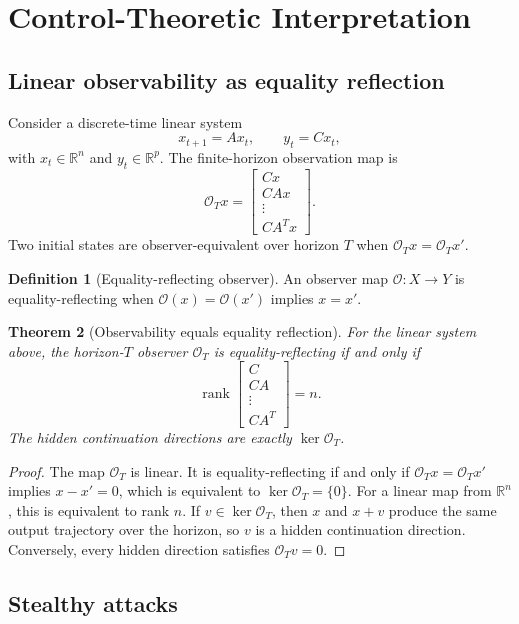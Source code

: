 \documentclass[11pt]{article}
\theoremstyle{definition}
\newtheorem{definition}{Definition}[section]
\theoremstyle{plain}
\newtheorem{theorem}[definition]{Theorem}
\theoremstyle{remark}
\newcommand{\R}{\mathbb{R}}
\newcommand{\cO}{\mathcal{O}}
\begin{document}
\section{Control-Theoretic Interpretation}

\subsection{Linear observability as equality reflection}

Consider a discrete-time linear system
\[
    x_{t+1}=Ax_t,\qquad y_t=Cx_t,
\]
with $x_t\in\R^n$ and $y_t\in\R^p$. The finite-horizon observation map is
\[
    \cO_T x = \begin{bmatrix} Cx \\ CAx \\ \vdots \\ CA^{T}x\end{bmatrix}.
\]
Two initial states are observer-equivalent over horizon $T$ when $\cO_Tx=\cO_Tx'$.

\begin{definition}[Equality-reflecting observer]
An observer map $\cO:X\to Y$ is equality-reflecting when $\cO(x)=\cO(x')$ implies $x=x'$.
\end{definition}

\begin{theorem}[Observability equals equality reflection]
For the linear system above, the horizon-$T$ observer $\cO_T$ is equality-reflecting if and only if
\[
    \operatorname{rank}\begin{bmatrix} C \\ CA \\ \vdots \\ CA^{T}\end{bmatrix}=n.
\]
The hidden continuation directions are exactly $\ker \cO_T$.
\end{theorem}

\begin{proof}
The map $\cO_T$ is linear. It is equality-reflecting if and only if $\cO_Tx=\cO_Tx'$ implies $x-x'=0$, which is equivalent to $\ker\cO_T=\{0\}$. For a linear map from $\R^n$, this is equivalent to rank $n$. If $v\in\ker\cO_T$, then $x$ and $x+v$ produce the same output trajectory over the horizon, so $v$ is a hidden continuation direction. Conversely, every hidden direction satisfies $\cO_Tv=0$.
\end{proof}

\subsection{Stealthy attacks}
\end{document}
